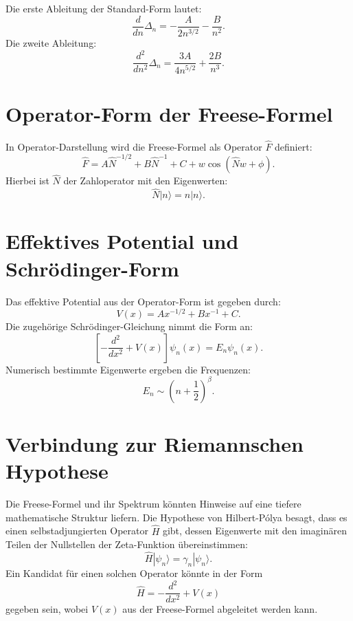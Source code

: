 \documentclass[a4paper,12pt]{article}
\begin{document}
Die erste Ableitung der Standard-Form lautet:
\begin{equation}
    \frac{d}{dn} \Delta_n = -\frac{A}{2 n^{3/2}} - \frac{B}{n^2}.
\end{equation}
Die zweite Ableitung:
\begin{equation}
    \frac{d^2}{dn^2} \Delta_n = \frac{3A}{4 n^{5/2}} + \frac{2B}{n^3}.
\end{equation}

\section{Operator-Form der Freese-Formel}

In Operator-Darstellung wird die Freese-Formel als Operator $\hat{F}$ definiert:
\begin{equation}
    \hat{F} = A \hat{N}^{-1/2} + B \hat{N}^{-1} + C + w \cos(\hat{N} w + \phi).
\end{equation}
Hierbei ist $\hat{N}$ der Zahloperator mit den Eigenwerten:
\begin{equation}
    \hat{N} |n\rangle = n |n\rangle.
\end{equation}

\section{Effektives Potential und Schrödinger-Form}

Das effektive Potential aus der Operator-Form ist gegeben durch:
\begin{equation}
    V(x) = A x^{-1/2} + B x^{-1} + C.
\end{equation}
Die zugehörige Schrödinger-Gleichung nimmt die Form an:
\begin{equation}
    \left[ -\frac{d^2}{dx^2} + V(x) \right] \psi_n(x) = E_n \psi_n(x).
\end{equation}
Numerisch bestimmte Eigenwerte ergeben die Frequenzen:
\begin{equation}
    E_n \sim \left( n + \frac{1}{2} \right)^\beta.
\end{equation}

\section{Verbindung zur Riemannschen Hypothese}

Die Freese-Formel und ihr Spektrum könnten Hinweise auf eine tiefere mathematische Struktur liefern. Die Hypothese von Hilbert-Pólya besagt, dass es einen selbstadjungierten Operator $\hat{H}$ gibt, dessen Eigenwerte mit den imaginären Teilen der Nullstellen der Zeta-Funktion übereinstimmen:
\begin{equation}
    \hat{H} | \psi_n \rangle = \gamma_n | \psi_n \rangle.
\end{equation}
Ein Kandidat für einen solchen Operator könnte in der Form
\begin{equation}
    \hat{H} = -\frac{d^2}{dx^2} + V(x)
\end{equation}
gegeben sein, wobei $V(x)$ aus der Freese-Formel abgeleitet werden kann.
\end{document}
